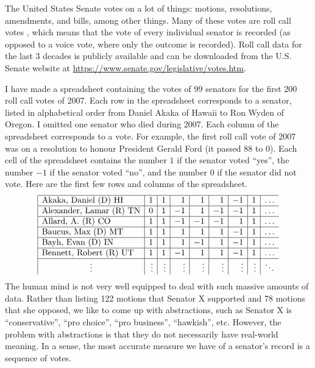 The United States Senate%
%
%
 votes on a lot of things: motions,
resolutions, amendments, and bills, among other things. Many of these
votes are roll call votes%
%
, which means that the vote of every individual
senator is recorded (as opposed to a voice vote, where only the
outcome is recorded). Roll call data for the last 3 decades is
publicly available and can be downloaded from the U.S. Senate website
at \url{https://www.senate.gov/legislative/votes.htm}.

I have made a spreadsheet containing the votes of 99 senators for the
first 200 roll call votes of 2007. Each row in the spreadsheet
corresponds to a senator, listed in alphabetical order from Daniel
Akaka of Hawaii to Ron Wyden of Oregon. I omitted one senator who died
during 2007. Each column of the spreadsheet corresponds to a vote. For
example, the first roll call vote of 2007 was on a resolution to
honour President Gerald Ford (it passed 88 to 0). Each cell of the
spreadsheet contains the number $1$ if the senator voted ``yes'', the
number $-1$ if the senator voted ``no'', and the number $0$ if the
senator did not vote. Here are the first few rows and columns of the
spreadsheet.
\begin{equation*}
  \begin{array}{|l|r|r|r|r|r|r|r|r}
    \hline
    \mbox{Akaka, Daniel (D) HI} & 1 & 1 & 1 & 1 & 1 & -1 & 1 & \ldots \\\hline
    \mbox{Alexander, Lamar (R) TN} & 0 & 1 & -1 & 1 & -1 & -1 & 1 & \ldots \\\hline
    \mbox{Allard, A. (R) CO} & 1 & 1 & -1 & -1 & -1 & 1 & 1 & \ldots \\\hline
    \mbox{Baucus, Max (D) MT} & 1 & 1 & 1 & 1 & 1 & -1 & 1 & \ldots \\\hline
    \mbox{Bayh, Evan (D) IN} & 1 & 1 & 1 & -1 & 1 & -1 & 1 & \ldots \\\hline
    \mbox{Bennett, Robert (R) UT} & 1 & 1 & -1 & 1 & 1 & -1 & 1 & \ldots \\\hline
    \multicolumn{1}{|c|}{\vdots} & \vdots & \vdots & \vdots & \vdots & \vdots & \vdots & \vdots & \ddots
  \end{array}
\end{equation*}
The human mind is not very well equipped to deal with such massive
amounts of data. Rather than listing 122 motions that Senator X
supported and 78 motions that she opposed, we like to come up with
abstractions, such as Senator X is ``conservative'', ``pro choice'',
``pro business'', ``hawkish'', etc. However, the problem with
abstractions is that they do not necessarily have real-world
meaning. In a sense, the most accurate measure we have of a senator's
record is a sequence of votes.

